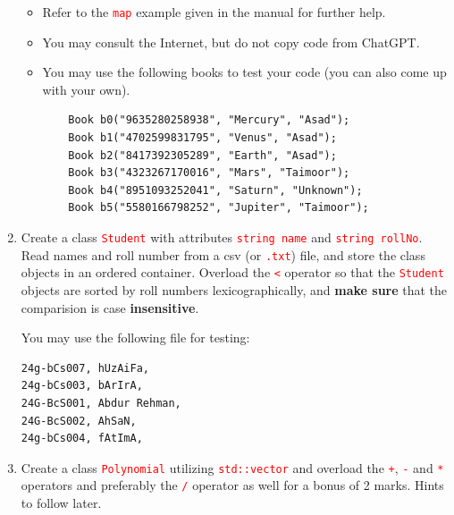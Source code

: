 \documentclass[12pt]{article}
\begin{document}
\begin{enumerate}
\begin{itemize}
        \item Refer to the \textcolor{red}{\texttt{map}} example given in the manual for further help.
        
        \item You may consult the Internet, but do not copy code from ChatGPT.

        \item You may use the following books to test your code (you can also come up with your own). 

\begin{verbatim}
    Book b0("9635280258938", "Mercury", "Asad");
    Book b1("4702599831795", "Venus", "Asad");
    Book b2("8417392305289", "Earth", "Asad");
    Book b3("4323267170016", "Mars", "Taimoor");
    Book b4("8951093252041", "Saturn", "Unknown");
    Book b5("5580166798252", "Jupiter", "Taimoor");
\end{verbatim}

    \end{itemize}

    \item Create a class \textcolor{red}{\texttt{Student}} with attributes \textcolor{red}{\texttt{string name}} and \textcolor{red}{\texttt{string rollNo}}. Read names and roll number 
    from a csv (or \textcolor{red}{\texttt{.txt}}) file, and store the class objects in an ordered container. Overload the \textcolor{red}{\texttt{<}} operator so that the 
    \textcolor{red}{\texttt{Student}} objects are sorted by roll numbers lexicographically, and \textbf{make sure} that the comparision is case \textbf{insensitive}. 
    
    You may use the following file for testing:

\begin{verbatim}
24g-bCs007, hUzAiFa,
24g-bCs003, bArIrA,
24G-BcS001, Abdur Rehman,
24G-BcS002, AhSaN,
24g-bCs004, fAtImA,
\end{verbatim}

    \item Create a class \textcolor{red}{\texttt{Polynomial}} utilizing \textcolor{red}{\texttt{std::vector}} and overload the \textcolor{red}{\texttt{+}}, \textcolor{red}{\texttt{-}} and 
    \textcolor{red}{\texttt{*}} operators and preferably the \textcolor{red}{\texttt{/}} operator as well for a bonus of 2 marks. Hints to follow later.

\end{enumerate}
\end{document}
